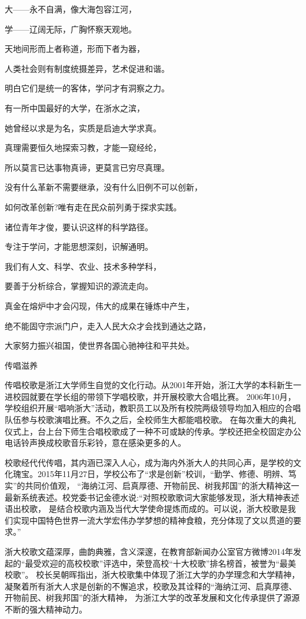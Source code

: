 \documentclass[UTF8]{ctexart}  %
\begin{document}
大——永不自满，像大海包容江河，

学——辽阔无际，广胸怀察天观地。

天地间形而上者称道，形而下者为器，

人类社会则有制度统摄差异，艺术促进和谐。

明白它们是统一的客体，学问才有洞察之力。

\vspace{2em}

有一所中国最好的大学，在浙水之滨，

她曾经以求是为名，实质是启迪大学求真。

真理需要恒久地探索习教，才能一窥经纶，

所以莫言已达事物真谛，更莫言已穷尽真理。

没有什么革新不需要继承，没有什么旧例不可以创新，

如何改革创新?唯有走在民众前列勇于探求实践。

诸位青年才俊，要认识这样的科学路径。

\vspace{2em}

专注于学问，才能思想深刻，识解通明。

我们有人文、科学、农业、技术多种学科，

要善于分析综合，掌握知识的源流走向。

真金在熔炉中才会闪现，伟大的成果在锤炼中产生，

绝不能固守宗派门户，走入人民大众才会找到通达之路，

大家努力振兴祖国，使世界各国心驰神往和平共处。

\newpage

\begin{flushleft}
    \textsf{传唱滋养}
\end{flushleft}


传唱校歌是浙江大学师生自觉的文化行动。从2001年开始，浙江大学的本科新生一进校园就要在学长组的带领下学唱校歌，并开展校歌大合唱比赛。
2006年10月，学校组织开展“唱响浙大”活动，教职员工以及所有校院两级领导均加入相应的合唱队伍参与校歌演唱比赛。不久之后，全校师生大都能唱校歌。
在每次重大的典礼仪式上，台上台下师生合唱校歌成了一种不可或缺的传承。学校还把全校固定办公电话铃声换成校歌音乐彩铃，意在感染更多的人。

校歌经代代传唱，其内涵已深入人心，成为海内外浙大人的共同心声，是学校的文化瑰宝。2015年11月27日，学校公布了“求是创新”校训，“勤学、修德、明辨、笃实”的共同价值观，
“海纳江河、启真厚德、开物前民、树我邦国”的浙大精神这一最新系统表述。校党委书记金德水说:“对照校歌歌词大家能够发现，浙大精神表述语出校歌，
是结合校歌内涵及当代大学使命提炼而成的。可以说，浙大校歌是我们实现中国特色世界一流大学宏伟办学梦想的精神食粮，充分体现了文以贯道的要求。”

浙大校歌文蕴深厚，曲韵典雅，含义深邃，在教育部新闻办公室官方微博2014年发起的“最受欢迎的高校校歌”评选中，荣登高校“十大校歌”排名榜首，被誉为“最美校歌”。
校长吴朝晖指出，浙大校歌集中体现了浙江大学的办学理念和大学精神，凝聚着所有浙大人求是创新的不懈追求，校歌及其诠释的“海纳江河、启真厚德、开物前民、树我邦国”的浙大精神，
为浙江大学的改革发展和文化传承提供了源源不断的强大精神动力。
\end{document}
